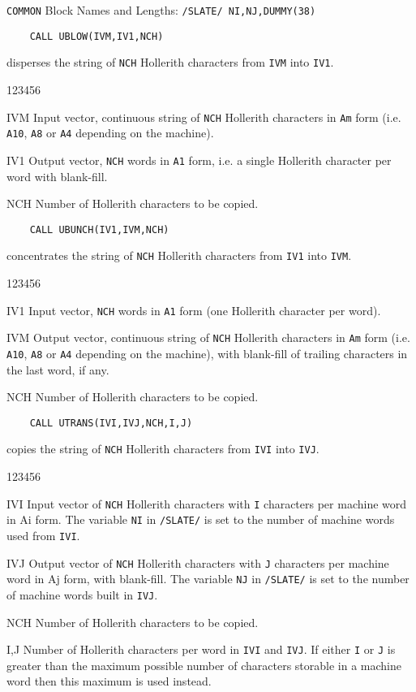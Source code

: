 {\tt COMMON} Block Names and Lengths: {\tt /SLATE/ NI,NJ,DUMMY(38)}
\Usage
\begin{verbatim}
    CALL UBLOW(IVM,IV1,NCH)
\end{verbatim}
disperses the string of {\tt NCH} Hollerith characters
from {\tt IVM} into {\tt IV1}.
\begin{DLtt}{123456}
\item [IVM] Input vector, continuous string of {\tt NCH} Hollerith
characters in {\tt Am} form
(i.e. {\tt A10}, {\tt A8} or {\tt A4} depending on the machine).
\item [IV1] Output vector, {\tt NCH} words in {\tt A1} form, i.e.
a single Hollerith character per word with blank-fill.
\item [NCH] Number of Hollerith characters to be copied.
\end{DLtt}
\begin{verbatim}
    CALL UBUNCH(IV1,IVM,NCH)
\end{verbatim}
concentrates the string of {\tt NCH} Hollerith characters from
{\tt IV1} into {\tt IVM}.
\begin{DLtt}{123456}
\item [IV1] Input vector, {\tt NCH} words in {\tt A1} form (one
Hollerith character per word).
\item [IVM] Output vector, continuous string of {\tt NCH} Hollerith
characters in {\tt Am} form
(i.e. {\tt A10}, {\tt A8} or {\tt A4} depending on the machine),
with blank-fill of trailing characters in the last word, if any.
\item [NCH] Number of Hollerith characters to be copied.
\end{DLtt}
\newpage
\begin{verbatim}
    CALL UTRANS(IVI,IVJ,NCH,I,J)
\end{verbatim}
copies the string of {\tt NCH} Hollerith characters from
{\tt IVI} into {\tt IVJ}.
\begin{DLtt}{123456}
\item [IVI] Input vector of {\tt NCH} Hollerith characters
with {\tt I} characters per machine word in Ai form.
The variable {\tt NI} in  {\tt /SLATE/} is set
to the number of machine words used from {\tt IVI}.
\item [IVJ] Output vector of {\tt NCH} Hollerith characters
with {\tt J} characters per machine word in Aj form, with blank-fill.
The variable {\tt NJ} in {\tt /SLATE/} is set to the number
of machine words built in {\tt IVJ}.
\item [NCH]  Number of Hollerith characters to be copied.
\item [I,J] Number of Hollerith characters per word in {\tt IVI}
and {\tt IVJ}.
If either {\tt I} or {\tt J} is greater than the maximum possible
number of characters storable in a machine word
then this maximum is used instead.
\end{DLtt}

